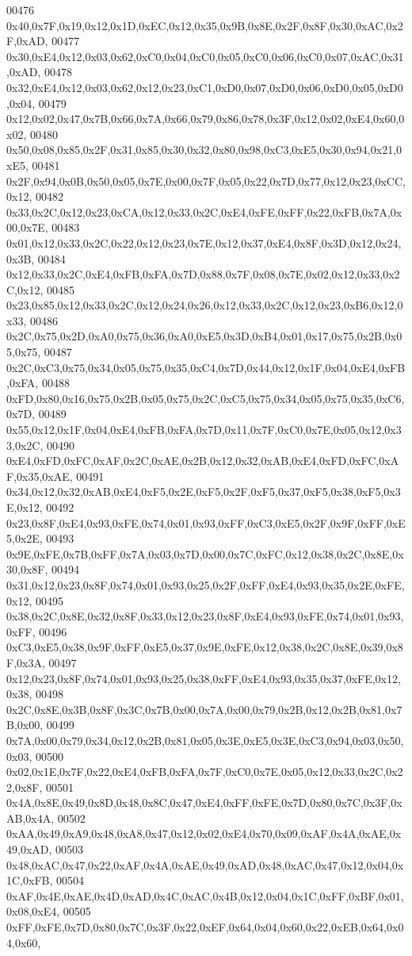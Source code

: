 \begin{DoxyCode}
00476 0x40,0x7F,0x19,0x12,0x1D,0xEC,0x12,0x35,0x9B,0x8E,0x2F,0x8F,0x30,0xAC,0x2F,0xAD,
00477 0x30,0xE4,0x12,0x03,0x62,0xC0,0x04,0xC0,0x05,0xC0,0x06,0xC0,0x07,0xAC,0x31,0xAD,
00478 0x32,0xE4,0x12,0x03,0x62,0x12,0x23,0xC1,0xD0,0x07,0xD0,0x06,0xD0,0x05,0xD0,0x04,
00479 0x12,0x02,0x47,0x7B,0x66,0x7A,0x66,0x79,0x86,0x78,0x3F,0x12,0x02,0xE4,0x60,0x02,
00480 0x50,0x08,0x85,0x2F,0x31,0x85,0x30,0x32,0x80,0x98,0xC3,0xE5,0x30,0x94,0x21,0xE5,
00481 0x2F,0x94,0x0B,0x50,0x05,0x7E,0x00,0x7F,0x05,0x22,0x7D,0x77,0x12,0x23,0xCC,0x12,
00482 0x33,0x2C,0x12,0x23,0xCA,0x12,0x33,0x2C,0xE4,0xFE,0xFF,0x22,0xFB,0x7A,0x00,0x7E,
00483 0x01,0x12,0x33,0x2C,0x22,0x12,0x23,0x7E,0x12,0x37,0xE4,0x8F,0x3D,0x12,0x24,0x3B,
00484 0x12,0x33,0x2C,0xE4,0xFB,0xFA,0x7D,0x88,0x7F,0x08,0x7E,0x02,0x12,0x33,0x2C,0x12,
00485 0x23,0x85,0x12,0x33,0x2C,0x12,0x24,0x26,0x12,0x33,0x2C,0x12,0x23,0xB6,0x12,0x33,
00486 0x2C,0x75,0x2D,0xA0,0x75,0x36,0xA0,0xE5,0x3D,0xB4,0x01,0x17,0x75,0x2B,0x05,0x75,
00487 0x2C,0xC3,0x75,0x34,0x05,0x75,0x35,0xC4,0x7D,0x44,0x12,0x1F,0x04,0xE4,0xFB,0xFA,
00488 0xFD,0x80,0x16,0x75,0x2B,0x05,0x75,0x2C,0xC5,0x75,0x34,0x05,0x75,0x35,0xC6,0x7D,
00489 0x55,0x12,0x1F,0x04,0xE4,0xFB,0xFA,0x7D,0x11,0x7F,0xC0,0x7E,0x05,0x12,0x33,0x2C,
00490 0xE4,0xFD,0xFC,0xAF,0x2C,0xAE,0x2B,0x12,0x32,0xAB,0xE4,0xFD,0xFC,0xAF,0x35,0xAE,
00491 0x34,0x12,0x32,0xAB,0xE4,0xF5,0x2E,0xF5,0x2F,0xF5,0x37,0xF5,0x38,0xF5,0x3E,0x12,
00492 0x23,0x8F,0xE4,0x93,0xFE,0x74,0x01,0x93,0xFF,0xC3,0xE5,0x2F,0x9F,0xFF,0xE5,0x2E,
00493 0x9E,0xFE,0x7B,0xFF,0x7A,0x03,0x7D,0x00,0x7C,0xFC,0x12,0x38,0x2C,0x8E,0x30,0x8F,
00494 0x31,0x12,0x23,0x8F,0x74,0x01,0x93,0x25,0x2F,0xFF,0xE4,0x93,0x35,0x2E,0xFE,0x12,
00495 0x38,0x2C,0x8E,0x32,0x8F,0x33,0x12,0x23,0x8F,0xE4,0x93,0xFE,0x74,0x01,0x93,0xFF,
00496 0xC3,0xE5,0x38,0x9F,0xFF,0xE5,0x37,0x9E,0xFE,0x12,0x38,0x2C,0x8E,0x39,0x8F,0x3A,
00497 0x12,0x23,0x8F,0x74,0x01,0x93,0x25,0x38,0xFF,0xE4,0x93,0x35,0x37,0xFE,0x12,0x38,
00498 0x2C,0x8E,0x3B,0x8F,0x3C,0x7B,0x00,0x7A,0x00,0x79,0x2B,0x12,0x2B,0x81,0x7B,0x00,
00499 0x7A,0x00,0x79,0x34,0x12,0x2B,0x81,0x05,0x3E,0xE5,0x3E,0xC3,0x94,0x03,0x50,0x03,
00500 0x02,0x1E,0x7F,0x22,0xE4,0xFB,0xFA,0x7F,0xC0,0x7E,0x05,0x12,0x33,0x2C,0x22,0x8F,
00501 0x4A,0x8E,0x49,0x8D,0x48,0x8C,0x47,0xE4,0xFF,0xFE,0x7D,0x80,0x7C,0x3F,0xAB,0x4A,
00502 0xAA,0x49,0xA9,0x48,0xA8,0x47,0x12,0x02,0xE4,0x70,0x09,0xAF,0x4A,0xAE,0x49,0xAD,
00503 0x48,0xAC,0x47,0x22,0xAF,0x4A,0xAE,0x49,0xAD,0x48,0xAC,0x47,0x12,0x04,0x1C,0xFB,
00504 0xAF,0x4E,0xAE,0x4D,0xAD,0x4C,0xAC,0x4B,0x12,0x04,0x1C,0xFF,0xBF,0x01,0x08,0xE4,
00505 0xFF,0xFE,0x7D,0x80,0x7C,0x3F,0x22,0xEF,0x64,0x04,0x60,0x22,0xEB,0x64,0x04,0x60,

\end{DoxyCode}
